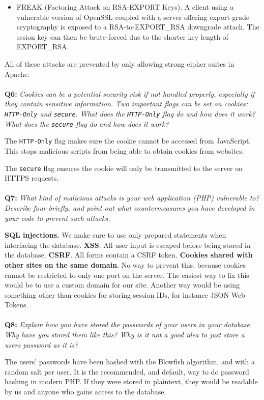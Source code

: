 \begin{itemize}
    \item
        FREAK (Factoring Attack on RSA-EXPORT Keys)\cite{freak-ssl-tls}.
        A client using a vulnerable version of OpenSSL coupled with a server offering export-grade cryptography is exposed to a RSA-to-EXPORT\_RSA downgrade attack.
        The sesion key can then be brute-forced due to the shorter key length of EXPORT\_RSA.

\end{itemize}

All of these attacks are prevented by only allowing strong cipher suites in Apache.

\paragraph{}
\textbf{Q6:}
\cprotect\textit{Cookies can be a potential security risk if not handled properly, especially if they contain sensitive information. Two important flags can be set on cookies: \verb/HTTP-Only/ and \verb/secure/. What does the \verb/HTTP-Only/ flag do and how does it work? What does the \verb/secure/ flag do and how does it work?}

The \verb/HTTP-Only/ flag makes sure the cookie cannot be accessed from JavaScript. This stops malicious scripts from being able to obtain cookies from websites.

The \verb/secure/ flag ensures the cookie will only be transmitted to the server on HTTPS requests.

\paragraph{}
\textbf{Q7:}
\textit{What kind of malicious attacks is your web application (PHP) vulnerable to? Describe four briefly, and point out what countermeasures you have developed in your code to prevent such attacks.}

\textbf{SQL injections.} We make sure to use only prepared statements when interfacing the database.
\textbf{XSS}. All user input is escaped before being stored in the database.
\textbf{CSRF}. All forms contain a CSRF token.
\textbf{Cookies shared with other sites on the same domain}. No way to prevent this, because cookies cannot be restricted to only one port on the server.
The easiest way to fix this would be to use a custom domain for our site.
Another way would be using something other than cookies for storing session IDs, for instance JSON Web Tokens.

\paragraph{}
\textbf{Q8:}
\textit{Explain how you have stored the passwords of your users in your database. Why have you stored them like this? Why is it not a good idea to just store a users password as it is?}

The users' passwords have been hashed with the Blowfish\cite{blowfish} algorithm, and with a random salt per user.
It is the recommended, and default, way to do password hashing in modern PHP\cite{php_passwords}.
If they were stored in plaintext, they would be readable by us and anyone who gains access to the database.
